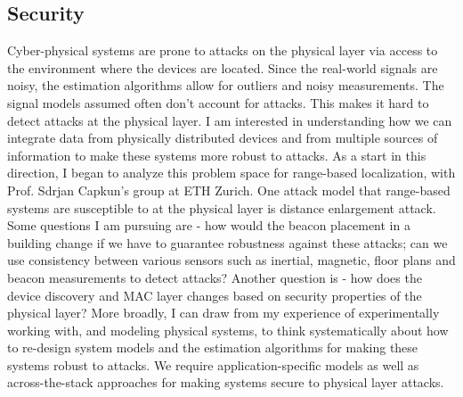 \documentclass[10pt]{article}
\begin{document}
\subsection{Security }
Cyber-physical systems are prone to attacks on the physical layer via access to the environment where the devices are located. %
 Since the real-world signals are noisy, the estimation algorithms allow for outliers and noisy measurements. The signal models assumed often don't account for attacks. This makes it hard to detect attacks at the physical layer. I am interested in understanding how we can integrate data from physically distributed devices and from multiple sources of information to make these systems more robust to attacks. As a start in this direction, I began to analyze this problem space for range-based localization, with Prof. Sdrjan Capkun's group at ETH Zurich. One attack model that range-based systems are susceptible to at the physical layer is distance enlargement attack. Some questions I am pursuing are - how would the beacon placement in a building change if we have to guarantee robustness against these attacks; can we use consistency between various sensors such as inertial, magnetic, floor plans and beacon measurements to detect attacks? Another question is - how does the device discovery and MAC layer changes based on security properties of the physical layer? 
More broadly, I can draw from my experience of experimentally working with, and modeling physical systems, to think systematically about how to re-design system models and the estimation algorithms for making these systems robust to attacks. We require application-specific models as well as across-the-stack approaches for making systems secure to physical layer attacks. %
\end{document}
